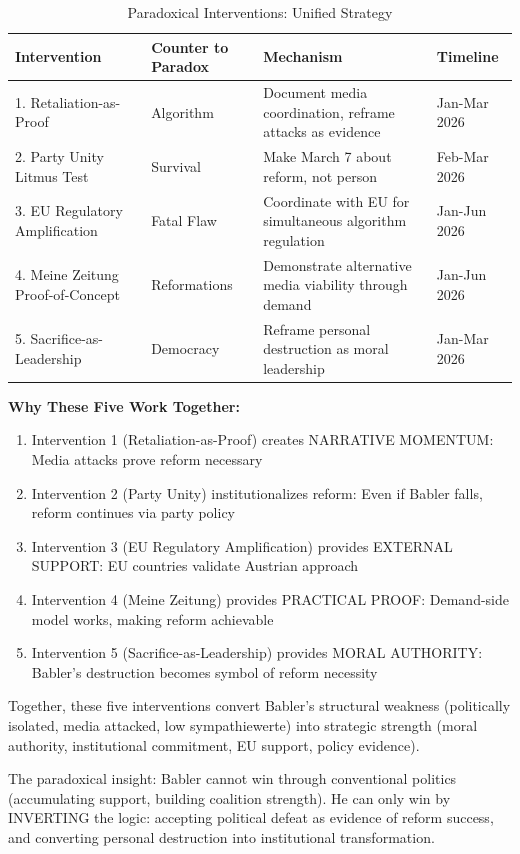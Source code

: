 \begin{table}[h]
\centering
\caption{Paradoxical Interventions: Unified Strategy}
\label{tab:dx-paradoxical-synthesis}
\begin{tabular}{|l|l|l|l|}
\hline
\textbf{Intervention} & \textbf{Counter to Paradox} & \textbf{Mechanism} & \textbf{Timeline} \\
\hline
1. Retaliation-as-Proof & Algorithm & Document media coordination, reframe attacks as evidence & Jan-Mar 2026 \\
2. Party Unity Litmus Test & Survival & Make March 7 about reform, not person & Feb-Mar 2026 \\
3. EU Regulatory Amplification & Fatal Flaw & Coordinate with EU for simultaneous algorithm regulation & Jan-Jun 2026 \\
4. Meine Zeitung Proof-of-Concept & Reformations & Demonstrate alternative media viability through demand & Jan-Jun 2026 \\
5. Sacrifice-as-Leadership & Democracy & Reframe personal destruction as moral leadership & Jan-Mar 2026 \\
\hline
\end{tabular}
\end{table}

\textbf{Why These Five Work Together:}

\begin{enumerate}
\item Intervention 1 (Retaliation-as-Proof) creates NARRATIVE MOMENTUM: Media attacks prove reform necessary
\item Intervention 2 (Party Unity) institutionalizes reform: Even if Babler falls, reform continues via party policy
\item Intervention 3 (EU Regulatory Amplification) provides EXTERNAL SUPPORT: EU countries validate Austrian approach
\item Intervention 4 (Meine Zeitung) provides PRACTICAL PROOF: Demand-side model works, making reform achievable
\item Intervention 5 (Sacrifice-as-Leadership) provides MORAL AUTHORITY: Babler's destruction becomes symbol of reform necessity
\end{enumerate}

Together, these five interventions convert Babler's structural weakness (politically isolated, media attacked, low sympathiewerte)
into strategic strength (moral authority, institutional commitment, EU support, policy evidence).

The paradoxical insight: Babler cannot win through conventional politics (accumulating support, building coalition strength).
He can only win by INVERTING the logic: accepting political defeat as evidence of reform success, and converting personal
destruction into institutional transformation.

